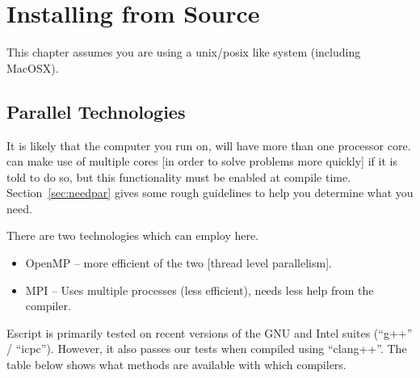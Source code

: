 %
%
%


\chapter{Installing from Source}\label{chap:source}

This chapter assumes you are using a unix/posix like system (including MacOSX).

\section{Parallel Technologies}\label{sec:par}
It is likely that the computer you run \escript on, will have more than one processor core.
\escript can make use of multiple cores [in order to solve problems more quickly] if it is told to do so,
but this functionality must be enabled at compile time.
Section~\ref{sec:needpar} gives some rough guidelines to help you determine what you need.

There are two technologies which \escript can employ here.
\begin{itemize}
 \item OpenMP -- more efficient of the two [thread level parallelism].
 \item MPI -- Uses multiple processes (less efficient), needs less help from the compiler.
\end{itemize}

Escript is primarily tested on recent versions of the GNU and Intel suites (``g++'' / ``icpc'').
However, it also passes our tests when compiled using ``clang++''.
The table below shows what methods are available with which compilers.

